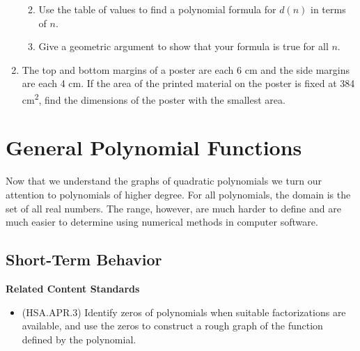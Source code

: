 \documentclass[
]{book}
\providecommand{\tightlist}{%
  \setlength{\itemsep}{0pt}\setlength{\parskip}{0pt}}
\newenvironment{standards}{}{}
\theoremstyle{definition}
\theoremstyle{definition}
\theoremstyle{definition}
\theoremstyle{definition}
\theoremstyle{remark}
\begin{document}
\begin{enumerate}
  \begin{enumerate}
  \def\labelenumii{\alph{enumii}.}
  \tightlist
  \item
    Use the table of values to find a polynomial formula for \(d(n)\) in terms of \(n\).
  \item
    Give a geometric argument to show that your formula is true for all \(n\).
  \end{enumerate}
\item
  The top and bottom margins of a poster are each 6 cm and the side margins are each 4 cm. If the area of the printed material on the poster is fixed at 384 cm\textsuperscript{2}, find the dimensions of the poster with the smallest area.
\end{enumerate}

\hypertarget{general-polynomial-functions}{%
\section{General Polynomial Functions}\label{general-polynomial-functions}}

Now that we understand the graphs of quadratic polynomials we turn our attention to polynomials of higher degree. For all polynomials, the domain is the set of all real numbers. The range, however, are much harder to define and are much easier to determine using numerical methods in computer software.

\hypertarget{short-term-behavior}{%
\subsection{Short-Term Behavior}\label{short-term-behavior}}

\begin{standards}

\begin{center}
\textbf{Related Content Standards}

\end{center}

\begin{itemize}
\tightlist
\item
  (HSA.APR.3) Identify zeros of polynomials when suitable factorizations are available, and use the zeros to construct a rough graph of the function defined by the polynomial.\\
\end{itemize}

\end{standards}
\end{document}
